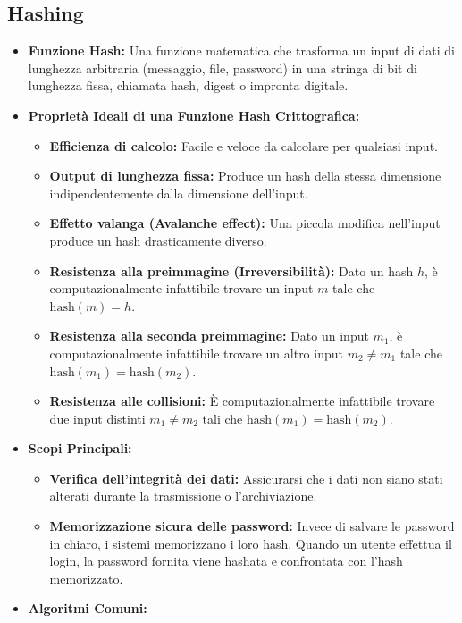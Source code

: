 \subsection{Hashing}
\begin{itemize}
    \item \textbf{Funzione Hash:} Una funzione matematica che trasforma un input di dati di lunghezza arbitraria (messaggio, file, password) in una stringa di bit di lunghezza fissa, chiamata hash, digest o impronta digitale.
    \item \textbf{Proprietà Ideali di una Funzione Hash Crittografica:}
    \begin{itemize}
        \item \textbf{Efficienza di calcolo:} Facile e veloce da calcolare per qualsiasi input.
        \item \textbf{Output di lunghezza fissa:} Produce un hash della stessa dimensione indipendentemente dalla dimensione dell'input.
        \item \textbf{Effetto valanga (Avalanche effect):} Una piccola modifica nell'input produce un hash drasticamente diverso.
        \item \textbf{Resistenza alla preimmagine (Irreversibilità):} Dato un hash \(h\), è computazionalmente infattibile trovare un input \(m\) tale che \(\text{hash}(m) = h\).
        \item \textbf{Resistenza alla seconda preimmagine:} Dato un input \(m_1\), è computazionalmente infattibile trovare un altro input \(m_2 \ne m_1\) tale che \(\text{hash}(m_1) = \text{hash}(m_2)\).
        \item \textbf{Resistenza alle collisioni:} È computazionalmente infattibile trovare due input distinti \(m_1 \ne m_2\) tali che \(\text{hash}(m_1) = \text{hash}(m_2)\).
    \end{itemize}
    \item \textbf{Scopi Principali:}
    \begin{itemize}
        \item \textbf{Verifica dell'integrità dei dati:} Assicurarsi che i dati non siano stati alterati durante la trasmissione o l'archiviazione.
        \item \textbf{Memorizzazione sicura delle password:} Invece di salvare le password in chiaro, i sistemi memorizzano i loro hash. Quando un utente effettua il login, la password fornita viene hashata e confrontata con l'hash memorizzato.
    \end{itemize}
    \item \textbf{Algoritmi Comuni:}

\end{itemize}
